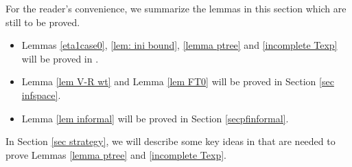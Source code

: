 \documentclass{article}
\newcommand{\1}{\mathds{1}}
\numberwithin{equation}{section}
\theoremstyle{plain} %
\theoremstyle{remark}
\begin{document}
For the reader's convenience, we  summarize the lemmas in this section which are still  to be proved. %
\begin{itemize}



\item Lemmas \ref{eta1case0}, \ref{lem: ini bound}, \ref{lemma ptree} and \ref{incomplete Texp} will be proved in \cite{PartII_high}.


\item Lemma \ref{lem V-R wt} and Lemma \ref{lem FT0} will be proved in Section \ref{sec infspace}.

\item Lemma \ref{lem informal} will be proved in Section \ref{secpfinformal}.
 

 
\end{itemize}
In Section \ref{sec strategy}, we will describe some key ideas in   \cite{PartII_high} that are needed to  prove  Lemmas \ref{lemma ptree} and \ref{incomplete Texp}. %
\end{document}
